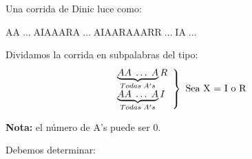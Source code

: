\documentclass[12pt,a4paper]{report}
\begin{document}
  			\par Una corrida de Dinic luce como:
  			\begin{center}
  				AA$\; \dotsc \;$AIAAARA$\; \dotsc \;$AIAARAAARR$\; \dotsc \;$IA$\; \dotsc \;$
  			\end{center}

  			\par Dividamos la corrida en subpalabras del tipo:
  			\begin{equation*}
  		  	\left.
  		  	\begin{array}{l}
  		    	\underbrace{AA \; \dotsc \; A}_{Todas \; A's}R \\
  		    	\underbrace{AA \; \dotsc \; A}_{Todas \; A's}I
  		  	\end{array}
  		  	\right\rbrace
  		  	\textup{ Sea X = I o R}
  			\end{equation*}
  			\par \textbf{Nota:} el número de A's puede ser 0.
  			\vspace{1.5mm}
  			\par Debemos determinar:
\end{document}
